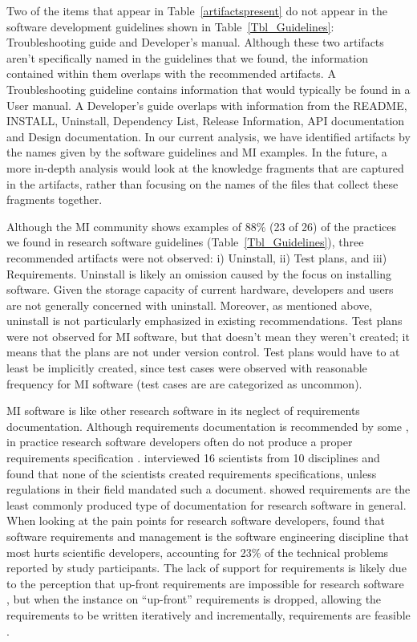 \documentclass[final, 3p, times, authoryear]{elsarticle}
\begin{document}
Two of the items that appear in Table~\ref{artifactspresent} do not appear in
the software development guidelines shown in Table~\ref{Tbl_Guidelines}:
Troubleshooting guide and Developer's manual.  Although these two artifacts
aren't specifically named in the guidelines that we found, the information
contained within them overlaps with the recommended artifacts.  A
Troubleshooting guideline contains information that would typically be found in
a User manual.  A Developer's guide overlaps with information from the README,
INSTALL, Uninstall, Dependency List, Release Information, API documentation and
Design documentation.  In our current analysis, we have identified artifacts by
the names given by the software guidelines and MI examples.  In the future, a
more in-depth analysis would look at the knowledge fragments that are captured
in the artifacts, rather than focusing on the names of the files that collect
these fragments together.

Although the MI community shows examples of 88\% (23 of 26) of the practices we
found in research software guidelines (Table~\ref{Tbl_Guidelines}), three
recommended artifacts were not observed: i) Uninstall, ii) Test plans, and iii)
Requirements.  Uninstall is likely an omission caused by the focus on installing
software. Given the storage capacity of current hardware, developers and users
are not generally concerned with uninstall.  Moreover, as mentioned above,
uninstall is not particularly emphasized in existing recommendations.  Test
plans were not observed for MI software, but that doesn't mean they weren't
created; it means that the plans are not under version control.  Test plans
would have to at least be implicitly created, since test cases were observed
with reasonable frequency for MI software (test cases are are categorized as
uncommon).

MI software is like other research software in its neglect of requirements
documentation.  Although requirements documentation is recommended by some
\citep{TobiasEtAl2018, HerouxEtAl2008, SmithAndKoothoor2016}, in practice
research software developers often do not produce a proper requirements
specification \citep{HeatonAndCarver2015}. \citet{SandersAndKelly2008}
interviewed 16 scientists from 10 disciplines and found that none of the
scientists created requirements specifications, unless regulations in their
field mandated such a document. \citet{Nguyen-HoanEtAl2010} showed requirements
are the least commonly produced type of documentation for research software in
general. When looking at the pain points for research software developers,
\citet{WieseEtAl2019} found that software requirements and management is the
software engineering discipline that most hurts scientific developers,
accounting for 23\% of the technical problems reported by study participants.
The lack of support for requirements is likely due to the perception that
up-front requirements are impossible for research software
\citep{CarverEtAl2007, SegalAndMorris2008}, but when the instance on
``up-front'' requirements is dropped, allowing the requirements to be written
iteratively and incrementally, requirements are feasible \citep{Smith2016}.  
\end{document}
